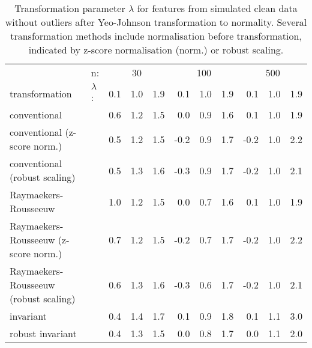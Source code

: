 \documentclass[
  a4paper,
]{article}
\begin{document}
\begin{table}
\begin{center}
\caption{Transformation parameter $\lambda$ for features from simulated clean data without outliers after Yeo-Johnson transformation to normality.
Several transformation methods include normalisation before transformation, indicated by z-score normalisation (norm.) or robust scaling.}
\label{tab:clean-transformation-lambda-appendix}
\small{
\begin{tabular}{l | l r r r r r r r r r}

\toprule
& n: & \multicolumn{3}{c}{30} & \multicolumn{3}{c}{100} & \multicolumn{3}{c}{500} \\
transformation & $\lambda$: & 0.1 & 1.0 & 1.9 & 0.1 & 1.0 & 1.9 & 0.1 & 1.0 & 1.9 \\

\midrule

conventional                          & & 0.6 & 1.2 & 1.5 &  0.0 & 0.9 & 1.6 &  0.1 & 1.0 & 1.9 \\
conventional (z-score norm.)          & & 0.5 & 1.2 & 1.5 & -0.2 & 0.9 & 1.7 & -0.2 & 1.0 & 2.2 \\
conventional (robust scaling)         & & 0.5 & 1.3 & 1.6 & -0.3 & 0.9 & 1.7 & -0.2 & 1.0 & 2.1 \\
Raymaekers-Rousseeuw                  & & 1.0 & 1.2 & 1.5 &  0.0 & 0.7 & 1.6 &  0.1 & 1.0 & 1.9 \\
Raymaekers-Rousseeuw (z-score norm.)  & & 0.7 & 1.2 & 1.5 & -0.2 & 0.7 & 1.7 & -0.2 & 1.0 & 2.2 \\
Raymaekers-Rousseeuw (robust scaling) & & 0.6 & 1.3 & 1.6 & -0.3 & 0.6 & 1.7 & -0.2 & 1.0 & 2.1 \\
invariant                             & & 0.4 & 1.4 & 1.7 &  0.1 & 0.9 & 1.8 &  0.1 & 1.1 & 3.0 \\
robust invariant                      & & 0.4 & 1.3 & 1.5 &  0.0 & 0.8 & 1.7 &  0.0 & 1.1 & 2.0 \\
\bottomrule
\end{tabular}
}
\end{center}
\end{table}
\end{document}
